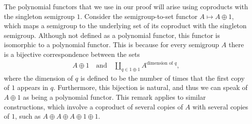    The polynomial functors that we  use in our proof will arise using coproducts with the singleton semigroup $1$. Consider  the semigroup-to-set functor $A \mapsto A \oplus 1$, which maps a semigroup to the underlying set of its coproduct with the singleton semigroup. Although not defined as a polynomial functor, this functor is isomorphic to a polynomial functor. This is because for every semigroup $A$ there is a bijective correspondence between the sets
    \begin{align}\label{eq:polynomial-representation-of-coproduct}
    A \oplus 1 \quad \text{and} \quad \coprod_{q \in 1 \oplus 1} A^{\text{dimension of $q$}},
    \end{align}
    where the dimension of $q$ is defined to be the number of times that the first copy of $1$ appears in $q$. Furthermore, this bijection is natural, and thus we can speak of $A \oplus 1$ as being a polynomial functor. This remark applies to similar constructions, which involve a coproduct of several copies of $A$ with several copies of $1$, such as $A \oplus A \oplus A \oplus 1 \oplus 1$.
    









